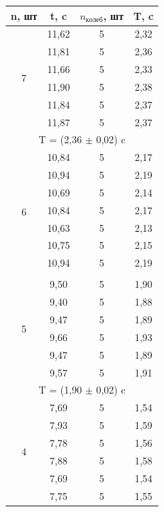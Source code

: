 \documentclass[a4paper,12pt]{article}
\begin{document}
\qquad

\begin{center}
 \begin{tabular}{|c|c|c|c|}
     \hline
     n, шт & t, c & $n_{колеб}$, шт & T, c \\
     \hline
     \multirow{6}{*}{7} & 11,62 & 5 & 2,32 \\
     \cline{2-4} & 11,81 & 5 & 2,36 \\
     \cline{2-4} & 11,66 & 5 & 2,33 \\
     \cline{2-4} & 11,90 & 5 & 2,38 \\
     \cline{2-4} & 11,84 & 5 & 2,37 \\
     \cline{2-4} & 11,87 & 5 & 2,37 \\
     \hline
     \multicolumn{4}{|c|}{T = (2,36 $\pm$ 0,02) c} \\
     \hline
     \multirow{8}{*}{6} & 10,84 & 5 & 2,17 \\
     \cline{2-4} & 10,94 & 5 & 2,19 \\
     \cline{2-4} & 10,69 & 5 & 2,14 \\
     \cline{2-4} & 10,84 & 5 & 2,17 \\
     \cline{2-4} & 10,63 & 5 & 2,13 \\
     \cline{2-4} & 10,75 & 5 & 2,15 \\
     \cline{2-4} & 10,94 & 5 & 2,19 \\
     \hline
     \multicolumn{4}{|c|}{T = (2,16 $\pm$ 0,02) c} \\
     \hline
     \multirow{6}{*}{5} & 9,50 & 5 & 1,90 \\
     \cline{2-4} & 9,40 & 5 & 1,88 \\
     \cline{2-4} & 9,47 & 5 & 1,89 \\
     \cline{2-4} & 9,66 & 5 & 1,93 \\
     \cline{2-4} & 9,47 & 5 & 1,89 \\
     \cline{2-4} & 9,57 & 5 & 1,91 \\
     \hline
     \multicolumn{4}{|c|}{T = (1,90 $\pm$ 0,02) c} \\
     \hline
     \multirow{6}{*}{4} & 7,69 & 5 & 1,54 \\
     \cline{2-4} & 7,93 & 5 & 1,59 \\
     \cline{2-4} & 7,78 & 5 & 1,56 \\
     \cline{2-4} & 7,88 & 5 & 1,58 \\
     \cline{2-4} & 7,69 & 5 & 1,54 \\
     \cline{2-4} & 7,75 & 5 & 1,55 \\

\end{tabular}
\end{center}
\end{document}
